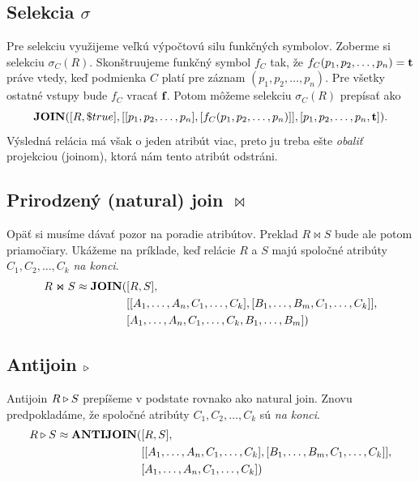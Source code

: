 \subsection*{Selekcia $\sigma$}
Pre selekciu využijeme veľkú výpočtovú silu funkčných symbolov. Zoberme si selekciu $\sigma_C(R)$.
Skonštruujeme funkčný symbol $f_C$ tak, že $f_C(p_1, p_2, \dots, p_n) = \textbf{t}\space$ práve vtedy, keď
podmienka $C$ platí pre záznam $(p_1, p_2, \dots, p_n)$. Pre všetky ostatné vstupy bude $f_C$ vracať
$\textbf{f}\space$. Potom môžeme selekciu $\sigma_C(R)$ prepísať ako
$$\textbf{JOIN}([R, \$true], [[p_1, p_2, \dots, p_n], [f_C(p_1, p_2, \dots, p_n)]], [p_1, p_2, \dots, p_n,
\textbf{t}\space])\text{.}$$ Výsledná relácia má však o jeden atribút viac, preto ju treba ešte \textit{obaliť}
projekciou (joinom), ktorá nám tento atribút odstráni.

\subsection*{Prirodzený (natural) join $\Join$}
Opäť si musíme dávať pozor na poradie atribútov. Preklad $R \Join S$ bude ale potom priamočiary.
Ukážeme na príklade, keď relácie $R$ a $S$ majú spoločné atribúty $C_1, C_2, \dots, C_k$ \textit{na
konci}.
\begin{align*}
    R \Join S \approx \textbf{JOIN}(&[R, S], \\
                            &[[A_1, \dots, A_n, C_1, \dots, C_k], [B_1, \dots, B_m, C_1, \dots, C_k]], \\
                            &[A_1, \dots, A_n, C_1, \dots, C_k, B_1, \dots, B_m])
\end{align*}

\subsection*{Antijoin $\triangleright$}
Antijoin $R \triangleright S$ prepíšeme v podstate rovnako ako natural join. Znovu predpokladáme, že
spoločné atribúty $C_1, C_2, \dots, C_k$ sú \textit{na konci}.
\begin{align*}
    R \triangleright S \approx \textbf{ANTIJOIN}(&[R, S], \\
                            &[[A_1, \dots, A_n, C_1, \dots, C_k], [B_1, \dots, B_m, C_1, \dots, C_k]], \\
                            &[A_1, \dots, A_n, C_1, \dots, C_k])
\end{align*}

